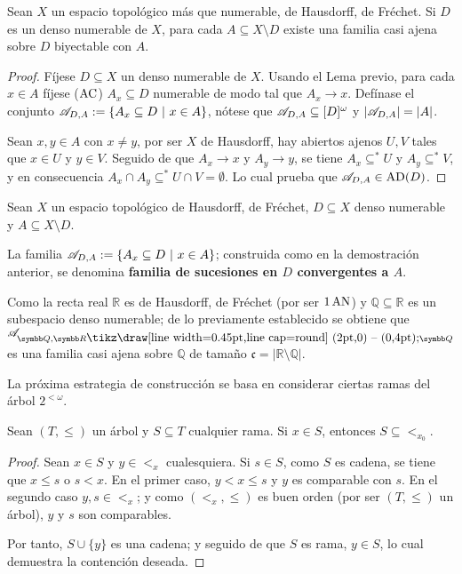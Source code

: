 
 \begin{proposicion}\label{prop-famSucesiones}
  Sean $X$ un espacio topológico más que numerable, de Hausdorff, de Fréchet. Si $D$ es un denso numerable de $X$, para cada $A \subseteq X \setminus D$ existe una familia casi ajena sobre $D$ biyectable con $A$.
 \end{proposicion}

 \begin{proof}
  Fíjese $D\subseteq X$ un denso numerable de $X$. Usando el Lema previo, para cada $x \in A$ fíjese ($\operatorname{AC}$) $A_x \subseteq D$ numerable de modo tal que $A_x \to x$. Defínase el conjunto $\mathscr{A}_{D,A}:=\{ A_x \subseteq D \text{ $|$ } x \in A \}$, nótese que $\mathscr{A}_{D,A} \subseteq [D]^\omega$ y $|\mathscr{A}_{D,A}|=|A|$.

  Sean $x,y \in A$ con $x \neq y$, por ser $X$ de Hausdorff, hay abiertos ajenos $U,V$ tales que $x \in U$ y $y \in V$. Seguido de que $A_x \to x$ y $A_y \to y$, se tiene $A_x \subseteq^* U$ y $A_y \subseteq ^* V$, y en consecuencia $A_x \cap A_y \subseteq^* U \cap V = \emptyset$. Lo cual prueba que $\mathscr{A}_{D,A} \in \operatorname{AD}(D)$.
 \end{proof}

 \begin{definicion}\label{def-FamSucesiones}
  Sean $X$ un espacio topológico de Hausdorff, de Fréchet, $D \subseteq X$ denso numerable y $A \subseteq X \setminus D$.

  La familia $\mathscr{A}_{D,A}:=\{ A_x \subseteq D \text{ $|$ } x \in A \}$; construida como en la demostración anterior, se denomina \textbf{familia de sucesiones en $D$ convergentes a $A$}.
 \end{definicion}

 Como la recta real $\mathbb{R}$ es de Hausdorff, de Fréchet (por ser $1\operatorname{AN}$) y $\mathbb{Q} \subseteq \mathbb{R}$ es un subespacio denso numerable; de lo previamente establecido se obtiene que $\ms{A}_{\mathbb{Q},\mathbb{R}\setminus \mathbb{Q}}$ es una familia casi ajena sobre $\mathbb{Q}$ de tamaño $\mathfrak{c}=|\mathbb{R} \setminus \mathbb{Q}|$.

 La próxima estrategia de construcción se basa en considerar ciertas ramas del árbol $2^{<\omega}$.

 \begin{lema}
  Sean $(T,\leq)$ un árbol y $S \subseteq T$ cualquier rama. Si $x \in S$, entonces $S \subseteq <_{x_0}$.
 \end{lema}
 \begin{proof}
  Sean $x \in S$ y $y \in <_{x}$ cualesquiera. Si $s \in S$, como $S$ es cadena, se tiene que $x \leq s$ o $s < x$. En el primer caso, $y<x\leq s$ y $y$ es comparable con $s$. En el segundo caso $y,s \in <_{x}$; y como $(<_{x},\leq)$ es buen orden (por ser $(T,\leq)$ un árbol), $y$ y $s$ son comparables.

  Por tanto, $S \cup \{y\}$ es una cadena; y seguido de que $S$ es rama, $y \in S$, lo cual demuestra la contención deseada.
 \end{proof}

